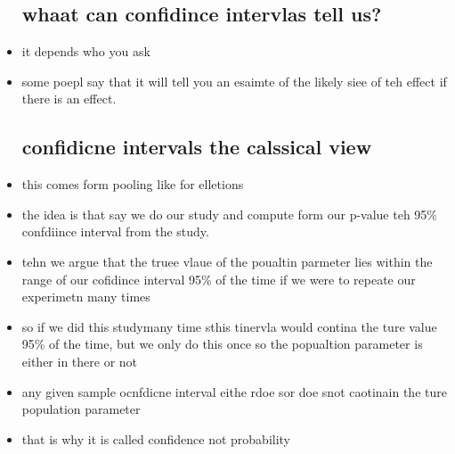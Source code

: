\documentclass{article}
\begin{document}
\begin{itemize}
\subsection{whaat can confidince intervlas tell us?}
\item it depends who you ask 
\item some poepl say that it will tell you an esaimte of the likely siee of teh effect if there is an effect. 
\subsection{ confidicne intervals the calssical view}
\item this comes form pooling like for elletions 
\item the idea is that say we do our study and compute form our p-value teh 95\% confdiince interval from the study.
\item tehn we argue that the truee vlaue of the poualtin parmeter lies within the range of our cofidince interval 95\% of the time if we were to repeate our experimetn many times
\item so if we did this studymany time sthis tinervla would contina the ture value 95\% of the time, but we only do this once so the popualtion parameter is either in there or not 
\item any given sample ocnfdicne interval eithe rdoe sor doe snot caotinain the ture population parameter 
\item that is why it is called confidence not probability 

\end{itemize}
\end{document}
